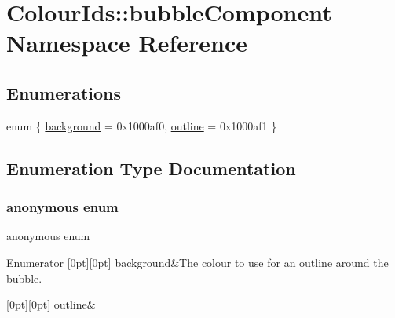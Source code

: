 \hypertarget{namespaceColourIds_1_1bubbleComponent}{}\section{Colour\+Ids\+:\+:bubble\+Component Namespace Reference}
\label{namespaceColourIds_1_1bubbleComponent}
\subsection*{Enumerations}
\begin{DoxyCompactItemize}
\item 
enum \{ \mbox{\hyperlink{namespaceColourIds_1_1bubbleComponent_ae74d82d1c643c7c451dccc7ed8ed481baaded9eddab8a5c47cb50349205fdeac1}{background}} = 0x1000af0, 
\mbox{\hyperlink{namespaceColourIds_1_1bubbleComponent_ae74d82d1c643c7c451dccc7ed8ed481baa20444f2bd86605bcd6eb681a6822ac3}{outline}} = 0x1000af1
 \}
\end{DoxyCompactItemize}


\subsection{Enumeration Type Documentation}
\mbox{\label{namespaceColourIds_1_1bubbleComponent_ae74d82d1c643c7c451dccc7ed8ed481b}} 
\subsubsection{\texorpdfstring{anonymous enum}{anonymous enum}}
{\footnotesize\ttfamily anonymous enum}

\begin{DoxyEnumFields}{Enumerator}
[0pt][0pt]{}\mbox{\label{namespaceColourIds_1_1bubbleComponent_ae74d82d1c643c7c451dccc7ed8ed481baaded9eddab8a5c47cb50349205fdeac1}} 
background&The colour to use for an outline around the bubble. \\
\hline

[0pt][0pt]{}\mbox{\label{namespaceColourIds_1_1bubbleComponent_ae74d82d1c643c7c451dccc7ed8ed481baa20444f2bd86605bcd6eb681a6822ac3}} 
outline&\\
\hline

\end{DoxyEnumFields}
